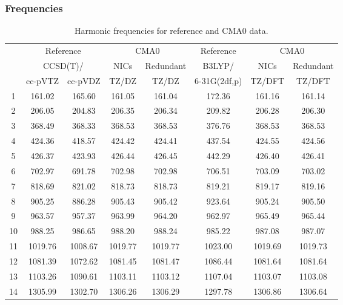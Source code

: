 \documentclass[10pt,oneside]{article}
\begin{document}
\begin{table}[h!]
\subsubsection*{Frequencies}
\centering
\caption{Harmonic frequencies for reference and CMA0 data.}
\begin{tabular}{cccccccc}
\toprule
{} & \multicolumn{2}{c}{Reference} & \multicolumn{2}{c}{CMA0} &    Reference & \multicolumn{2}{c}{CMA0} \\
{} & \multicolumn{2}{c}{CCSD(T)/} &    NICs &  Redundant &       B3LYP/ &    NICs & Redundant \\
{} &   cc-pVTZ & cc-pVDZ &   TZ/DZ &      TZ/DZ & 6-31G(2df,p) &  TZ/DFT &    TZ/DFT \\
\midrule
1  &    161.02 &  165.60 &  161.05 &     161.04 &       172.36 &  161.16 &    161.14 \\
2  &    206.05 &  204.83 &  206.35 &     206.34 &       209.82 &  206.28 &    206.30 \\
3  &    368.49 &  368.33 &  368.53 &     368.53 &       376.76 &  368.53 &    368.53 \\
4  &    424.36 &  418.57 &  424.42 &     424.41 &       437.54 &  424.55 &    424.56 \\
5  &    426.37 &  423.93 &  426.44 &     426.45 &       442.29 &  426.40 &    426.41 \\
6  &    702.97 &  691.78 &  702.98 &     702.98 &       706.51 &  703.09 &    703.02 \\
7  &    818.69 &  821.02 &  818.73 &     818.73 &       819.21 &  819.17 &    819.16 \\
8  &    905.25 &  886.28 &  905.43 &     905.42 &       923.64 &  905.24 &    905.50 \\
9  &    963.57 &  957.37 &  963.99 &     964.20 &       962.97 &  965.49 &    965.44 \\
10 &    988.25 &  986.65 &  988.20 &     988.24 &       985.22 &  987.08 &    987.07 \\
11 &   1019.76 & 1008.67 & 1019.77 &    1019.77 &      1023.00 & 1019.69 &   1019.73 \\
12 &   1081.39 & 1072.62 & 1081.45 &    1081.47 &      1086.44 & 1081.64 &   1081.64 \\
13 &   1103.26 & 1090.61 & 1103.11 &    1103.12 &      1107.04 & 1103.07 &   1103.08 \\
14 &   1305.99 & 1302.70 & 1306.26 &    1306.29 &      1297.78 & 1306.86 &   1306.64 \\

\end{tabular}
\end{table}
\end{document}
